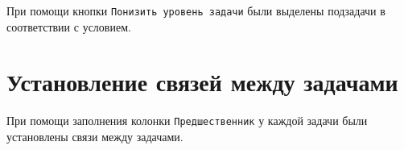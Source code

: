 При помощи кнопки \texttt{Понизить уровень задачи} были выделены подзадачи в соответствии с условием.


\clearpage

\section{Установление связей между задачами}

При помощи заполнения колонки \texttt{Предшественник} у каждой задачи были установлены связи между задачами.

